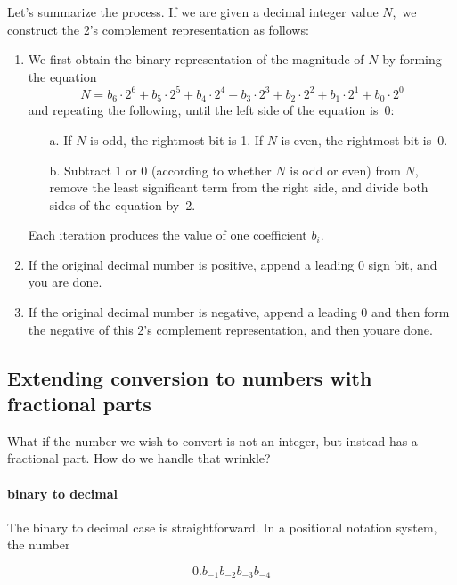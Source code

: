 \documentclass{patt}
\begin{document}
Let's summarize the process. If we are given a decimal integer value
$N$,~we construct the 2's complement representation as follows:

\begin{enumerate}
\item We first obtain the binary representation of the magnitude of
$N$ by forming the equation
\begin{equation*}
N=b_6\cdot 2^6+b_5\cdot 2^5+b_4\cdot 2^4+b_3\cdot 2^3+b_2\cdot 2^2+b_1\cdot 2^1+b_0\cdot 2^0
\end{equation*}
and repeating the following, until the left side of
the equation is~0:
\begin{enumerate}[a.]
\item[a.] If $N$ is odd, the rightmost bit is 1.  If $N$ is even,
the rightmost bit is~0.
\item[b.] Subtract 1 or 0 (according to whether $N$ is odd or even)
  from $N$, remove the least significant term from the right side, and
  divide both sides of the equation by~2.
\end{enumerate}
Each iteration produces the value of one coefficient $b_i$.

\item If the original decimal number is positive, append a leading 0
  sign bit, and you are done.

\item If the original decimal number is negative, append a leading 0
  and then form the negative of this 2's complement representation,
  and then you\break are done.
\end{enumerate}

\vspace{-12pt}

\subsection{Extending conversion to numbers with fractional parts}

What if the number we wish to convert is not an integer, but instead has
a fractional part.  How do we handle that wrinkle?
\paragraph{binary to decimal}

The binary to decimal case is straightforward.  In a positional notation
system, the number 

\noindent
$$0.b_{-1}b_{-2}b_{-3}b_{-4}$$
\end{document}
